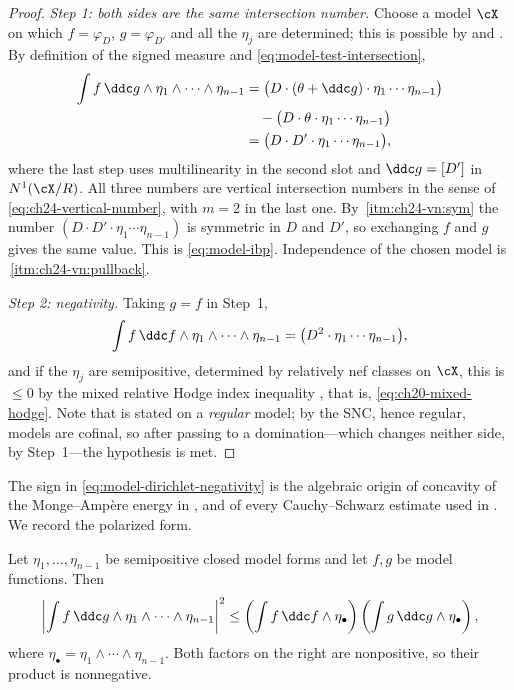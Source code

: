 \begin{proof}
\emph{Step 1: both sides are the same intersection number.}  Choose a model
$\cX$ on which $f=\varphi_D$, $g=\varphi_{D'}$ and all the $\eta_j$
are determined; this is possible by  and
.  By definition of the signed measure and
\eqref{eq:model-test-intersection},
\[
 \begin{aligned}
 \int f\,\ddc g\wedge\eta_1\wedge\cdots\wedge\eta_{n-1}
 &=\bigl(D\cdot(\theta+\ddc g)\cdot\eta_1\cdots\eta_{n-1}\bigr)\\
 &\quad-\bigl(D\cdot\theta\cdot\eta_1\cdots\eta_{n-1}\bigr)\\
 &=\bigl(D\cdot D'\cdot\eta_1\cdots\eta_{n-1}\bigr),
 \end{aligned}
\]
where the last step uses multilinearity in the second slot and
$\ddc g=[D']$ in $N^1(\cX/R)$.  All three numbers are vertical
intersection numbers in the sense of \eqref{eq:ch24-vertical-number}, with
$m=2$ in the last one.  By
\,\cref{itm:ch24-vn:sym} the number
$(D\cdot D'\cdot\eta_1\cdots\eta_{n-1})$ is symmetric in $D$ and
$D'$, so exchanging $f$ and $g$ gives the same value.  This is
\eqref{eq:model-ibp}.  Independence of the chosen model is
\,\cref{itm:ch24-vn:pullback}.

\emph{Step 2: negativity.}  Taking $g=f$ in Step~1,
\[
 \int f\,\ddc f\wedge\eta_1\wedge\cdots\wedge\eta_{n-1}
 =\bigl(D^2\cdot\eta_1\cdots\eta_{n-1}\bigr),
\]
and if the $\eta_j$ are semipositive, determined by relatively nef classes
on $\cX$, this is $\leq0$ by the mixed relative Hodge index inequality
, that is,
\eqref{eq:ch20-mixed-hodge}.  Note that  is
stated on a \emph{regular} model; by  the SNC, hence
regular, models are cofinal, so after passing to a domination---which
changes neither side, by Step~1---the hypothesis is met.
\end{proof}

The sign in \eqref{eq:model-dirichlet-negativity} is the algebraic origin of
concavity of the Monge--Amp\`ere energy in , and of
every Cauchy--Schwarz estimate used in .  We record
the polarized form.

\begin{proposition}
\label{prop:ch24-model-cauchy-schwarz}
Let $\eta_1,\ldots,\eta_{n-1}$ be semipositive closed model forms and let
$f,g$ be model functions.  Then
\begin{equation}
\label{eq:ch24-model-cauchy-schwarz}
 \left|\int f\,\ddc g\wedge\eta_1\wedge\cdots\wedge\eta_{n-1}\right|^{2}
 \leq
 \left(\int f\,\ddc f\wedge\eta_\bullet\right)
 \left(\int g\,\ddc g\wedge\eta_\bullet\right),
\end{equation}
where $\eta_\bullet=\eta_1\wedge\cdots\wedge\eta_{n-1}$.  Both factors on
the right are nonpositive, so their product is nonnegative.
\end{proposition}

